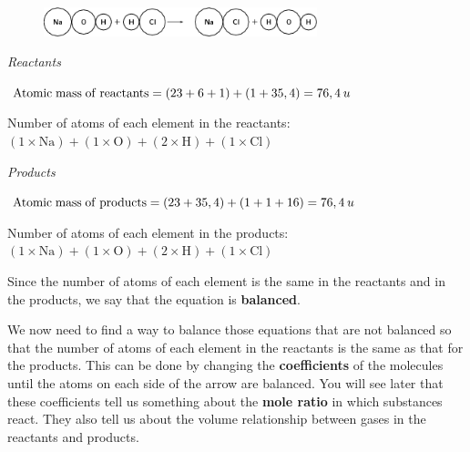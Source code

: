         \par 
        \label{m38726*id63537}
    \setcounter{subfigure}{0}
	\begin{figure}[H] %
    \begin{center}
    \label{m38726*id63540!!!underscore!!!media}\label{m38726*id63540!!!underscore!!!printimage}\includegraphics[width=300px]{col11305.imgs/m38726_CG10C5_003.png} %
      \vspace{2pt}
    \vspace{.1in}
    \end{center}
 \end{figure}       
        \par 
        \label{m38726*id63546}
          \textsl{Reactants}
        \par 
        \label{m38726*id63553}$\mathrm{Atomic\; mass\; of\; reactants}=\left(23+6+1\right)+\left(1+35,4\right)=\mathrm{76,4}\phantom{\rule{2pt}{0ex}}u$\par 
        \label{m38726*id63556}Number of atoms of each element in the reactants: $\left(1\ensuremath{\times}\mathrm{Na}\right)+\left(1\ensuremath{\times}\mathrm{O}\right)+\left(2\ensuremath{\times}\mathrm{H}\right)+\left(1\ensuremath{\times}\mathrm{Cl}\right)$ \par 
        \label{m38726*id63592}
          \textsl{Products}
        \par 
        \label{m38726*id63600}$\mathrm{Atomic\; mass\; of\; products}=\left(23+35,4\right)+\left(1+1+16\right)=\mathrm{76,4}\phantom{\rule{2pt}{0ex}}u$\par 
        \label{m38726*id63604}Number of atoms of each element in the products: $\left(1\ensuremath{\times}\mathrm{Na}\right)+\left(1\ensuremath{\times}\mathrm{O}\right)+\left(2\ensuremath{\times}\mathrm{H}\right)+\left(1\ensuremath{\times}\mathrm{Cl}\right)$\par 
        \label{m38726*id63639}Since the number of atoms of each element is the same in the reactants and in the products, we say that the equation is \textbf{balanced}.\par 
        \label{m38726*id63649}We now need to find a way to balance those equations that are not balanced so that the number of atoms of each element in the reactants is the same as that for the products. This can be done by changing the \textbf{coefficients} of the molecules until the atoms on each side of the arrow are balanced. You will see later that these coefficients tell us something about the \textbf{mole ratio} in which substances react. They also tell us about the volume relationship between gases in the reactants and products.\par 

